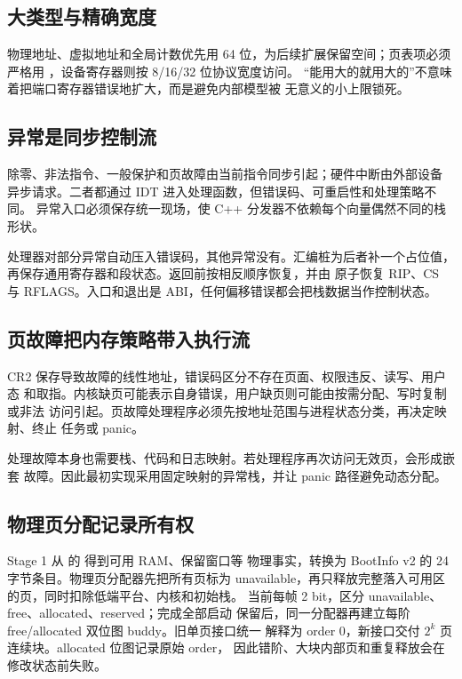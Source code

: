 \subsection{大类型与精确宽度}

物理地址、虚拟地址和全局计数优先用 64 位，为后续扩展保留空间；页表项必须
严格用 ，设备寄存器则按 8/16/32 位协议宽度访问。
“能用大的就用大的”不意味着把端口寄存器错误地扩大，而是避免内部模型被
无意义的小上限锁死。

\subsection{异常是同步控制流}

除零、非法指令、一般保护和页故障由当前指令同步引起；硬件中断由外部设备
异步请求。二者都通过 IDT 进入处理函数，但错误码、可重启性和处理策略不同。
异常入口必须保存统一现场，使 C++ 分发器不依赖每个向量偶然不同的栈形状。

处理器对部分异常自动压入错误码，其他异常没有。汇编桩为后者补一个占位值，
再保存通用寄存器和段状态。返回前按相反顺序恢复，并由  原子恢复
RIP、CS 与 RFLAGS。入口和退出是 ABI，任何偏移错误都会把栈数据当作控制状态。

\subsection{页故障把内存策略带入执行流}

CR2 保存导致故障的线性地址，错误码区分不存在页面、权限违反、读写、用户态
和取指。内核缺页可能表示自身错误，用户缺页则可能由按需分配、写时复制或非法
访问引起。页故障处理程序必须先按地址范围与进程状态分类，再决定映射、终止
任务或 panic。

处理故障本身也需要栈、代码和日志映射。若处理程序再次访问无效页，会形成嵌套
故障。因此最初实现采用固定映射的异常栈，并让 panic 路径避免动态分配。

\subsection{物理页分配记录所有权}

Stage 1 从  的  得到可用 RAM、保留窗口等
物理事实，转换为 BootInfo v2 的 24 字节条目。物理页分配器先把所有页标为
unavailable，再只释放完整落入可用区的页，同时扣除低端平台、内核和初始栈。
当前每帧 2 bit，区分 unavailable、free、allocated、reserved；完成全部启动
保留后，同一分配器再建立每阶 free/allocated 双位图 buddy。旧单页接口统一
解释为 order 0，新接口交付 \(2^k\) 页连续块。allocated 位图记录原始 order，
因此错阶、大块内部页和重复释放会在修改状态前失败。

